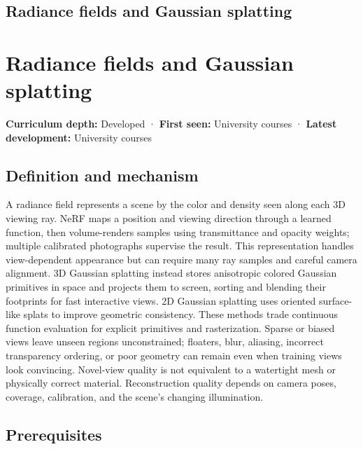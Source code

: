 \hypertarget{appendix-c5b332e400e7}{}
\section*{Radiance fields and Gaussian splatting}
\chapter{Radiance fields and Gaussian splatting}\label{appendix-c5b332e400e7-radiance-fields-and-gaussian-splatting}

\textbf{Curriculum depth:} Developed · \textbf{First seen:} University courses · \textbf{Latest development:} University courses

\section{Definition and mechanism}\label{appendix-c5b332e400e7-definition-and-mechanism}

A radiance field represents a scene by the color and density seen along each 3D viewing ray. NeRF maps a position and viewing direction through a learned function, then volume-renders samples using transmittance and opacity weights; multiple calibrated photographs supervise the result. This representation handles view-dependent appearance but can require many ray samples and careful camera alignment. 3D Gaussian splatting instead stores anisotropic colored Gaussian primitives in space and projects them to screen, sorting and blending their footprints for fast interactive views. 2D Gaussian splatting uses oriented surface-like splats to improve geometric consistency. These methods trade continuous function evaluation for explicit primitives and rasterization. Sparse or biased views leave unseen regions unconstrained; floaters, blur, aliasing, incorrect transparency ordering, or poor geometry can remain even when training views look convincing. Novel-view quality is not equivalent to a watertight mesh or physically correct material. Reconstruction quality depends on camera poses, coverage, calibration, and the scene's changing illumination.

\section{Prerequisites}\label{appendix-c5b332e400e7-prerequisites}

